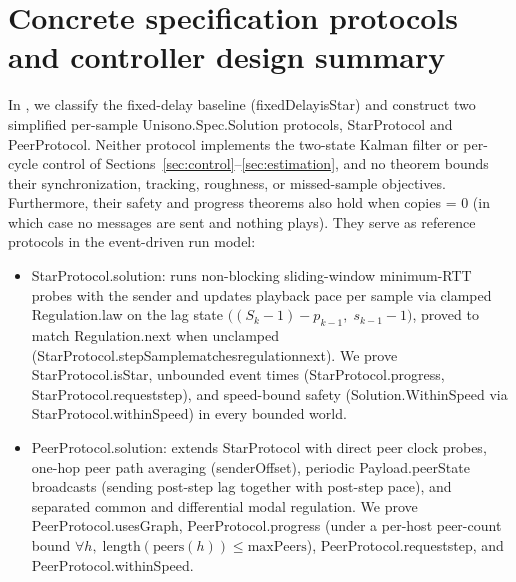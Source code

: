 \documentclass[11pt,a4paper]{article}
\DeclareRobustCommand{\lean}[1]{{\ttfamily\def\_{\textunderscore\allowbreak}#1}}
\theoremstyle{definition}
\begin{document}
\section{Concrete specification protocols and controller design summary}
\label{sec:impl}

In , we classify the
fixed-delay baseline (\lean{fixedDelay\_isStar}) and construct two simplified
per-sample \lean{Unisono.Spec.Solution} protocols, \lean{StarProtocol} and
\lean{PeerProtocol}. Neither protocol implements the two-state Kalman filter or
per-cycle control of Sections~\ref{sec:control}--\ref{sec:estimation}, and no
theorem bounds their synchronization, tracking, roughness, or missed-sample
objectives. Furthermore, their safety and progress theorems also hold when
\lean{copies = 0} (in which case no messages are sent and nothing plays). They
serve as reference protocols in the event-driven run model:
\begin{itemize}
\item \lean{StarProtocol.solution}: runs non-blocking sliding-window minimum-RTT
  probes with the sender and updates playback pace per sample via clamped
  \lean{Regulation.law} on the lag state
  $\bigl((S_k - 1) - p_{k-1},\; s_{k-1} - 1\bigr)$, proved to match
  \lean{Regulation.next} when unclamped
  (\lean{StarProtocol.stepSample\_matches\_regulation\_next}). We prove
  \lean{StarProtocol.isStar}, unbounded event times (\lean{StarProtocol.progress},
  \lean{StarProtocol.request\_step}), and speed-bound safety
  (\lean{Solution.WithinSpeed} via \lean{StarProtocol.withinSpeed}) in every
  bounded world.
\item \lean{PeerProtocol.solution}: extends \lean{StarProtocol} with direct
  peer clock probes, one-hop peer path averaging (\lean{senderOffset}),
  periodic \lean{Payload.peerState} broadcasts (sending post-step lag together
  with post-step pace), and separated common and differential modal regulation.
  We prove \lean{PeerProtocol.usesGraph}, \lean{PeerProtocol.progress} (under a
  per-host peer-count bound
  $\forall h,\; \mathrm{length}(\mathrm{peers}(h)) \le \mathrm{maxPeers}$),
  \lean{PeerProtocol.request\_step}, and \lean{PeerProtocol.withinSpeed}.
\end{itemize}
\end{document}
